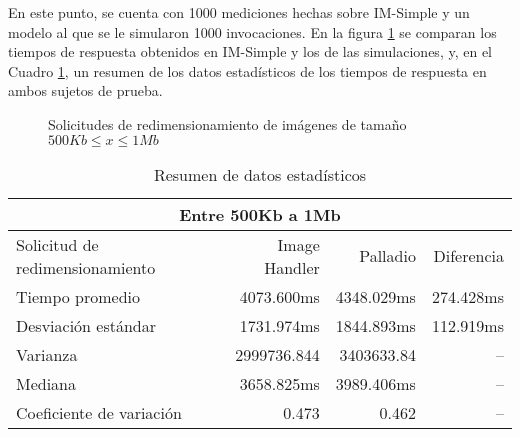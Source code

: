 En este punto, se cuenta con 1000 mediciones hechas sobre IM-Simple y un modelo al que se le simularon 1000 invocaciones. En la figura \ref{fig:comparacion-imsimple-palladio-1mb} se comparan los tiempos de respuesta obtenidos en IM-Simple y los de las simulaciones, y, en el Cuadro \ref{table:datos-estadisticos-hasta-1mb}, un resumen de los datos estadísticos de los tiempos de respuesta en ambos sujetos de prueba.


\hspace{-2cm}
\begin{figure}[h]
\caption{Solicitudes de redimensionamiento de imágenes de tamaño $500Kb \leq x \leq 1Mb$}
\label{fig:comparacion-imsimple-palladio-1mb}
\end{figure}

\begin{table}
    \centering
    \begin{tabular}{l|r|r|r}
        \toprule[1.5pt]
         \multicolumn{4}{c}{\textbf{Entre 500Kb a 1Mb}} \\
        \midrule
        Solicitud de redimensionamiento  & Image Handler & Palladio & Diferencia\\  
        \midrule        
        Tiempo promedio  & 4073.600ms & 4348.029ms & 274.428ms\\
        Desviación estándar & 1731.974ms & 1844.893ms & 112.919ms\\
        Varianza & 2999736.844 & 3403633.84 & --\\
        Mediana & 3658.825ms & 3989.406ms & -- \\
        Coeficiente de variación & 0.473 & 0.462 & -- \\                      
        \bottomrule[1.5pt]
    \end{tabular}
    \caption{Resumen de datos estadísticos}
    \label{table:datos-estadisticos-hasta-1mb}
\end{table}

